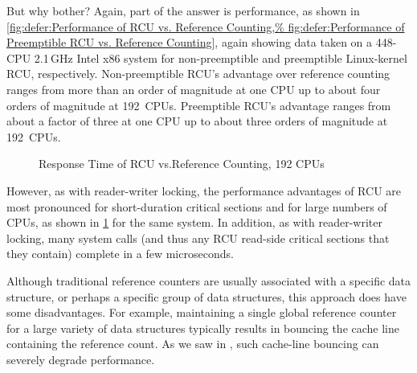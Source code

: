 But why bother?
Again, part of the answer is performance, as shown in
\cref{fig:defer:Performance of RCU vs. Reference Counting,%
fig:defer:Performance of Preemptible RCU vs. Reference Counting},
again showing data taken on a 448-CPU 2.1\,GHz Intel x86 system
for non-preemptible and preemptible Linux-kernel RCU, respectively.
Non-preemptible RCU's advantage over reference counting ranges from
more than an order of magnitude at one CPU up to about four orders of
magnitude at 192~CPUs.
Preemptible RCU's advantage ranges from about a factor of three at
one CPU up to about three orders of magnitude at 192~CPUs.

\begin{figure}
\centering
{}
\caption{Response Time of RCU vs.\@ Reference Counting, 192 CPUs}
\label{fig:defer:Response Time of RCU vs. Reference Counting}
\end{figure}

However, as with reader-writer locking, the performance advantages of
RCU are most pronounced for short-duration critical sections and for
large numbers of CPUs, as shown in
\cref{fig:defer:Response Time of RCU vs. Reference Counting}
for the same system.
In addition, as with reader-writer locking, many system calls (and thus
any RCU read-side critical sections that they contain) complete in
a few microseconds.

Although traditional reference counters are usually associated with a
specific data structure, or perhaps a specific group of data structures,
this approach does have some disadvantages.
For example, maintaining a single global reference counter for a large
variety of data structures typically results in bouncing the cache line
containing the reference count.
As we saw in
,
such cache-line bouncing can severely degrade performance.

